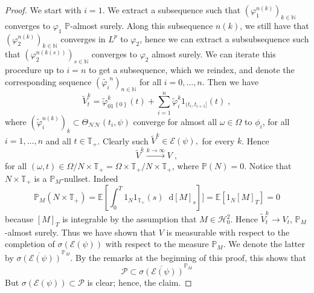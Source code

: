 \documentclass[11pt]{report}
\newcommand{\diff}{\mathop{}\!\mathrm{d}}
\theoremstyle{plain} %
\theoremstyle{definition} %
\theoremstyle{remark} %
\begin{document}
\begin{proof}
    We start with \(i=1\). We extract a subsequence such that \((\varphi_1^{n(k)})_{k\in\mathbb{N}}\) converges to \(\varphi_1\) \(\mathbb{P}\)-almost surely. Along this subsequence \(n(k)\), we still have that \((\varphi_{2}^{n(k)})_{k\in\mathbb{N}}\) converges in \(L^p\) to \(\varphi_2\), hence we can extract a subsubsequence such that \((\varphi_{2}^{n(k(s))})_{s\in\mathbb{N}}\) converges to \(\varphi_2\) almost surely. We can iterate this procedure up to \(i=n\) to get a subsequence, which we reindex, and denote the corresponding sequence \((\widetilde{\varphi_i}^n)_{n\in\mathbb{N}}\) for all \(i=0,\dots,n\). Then we have 
   \begin{equation}\label{eq:neural simple processes}
        \widetilde{V}_t^{k} = \widetilde{\varphi}^{k}_01_{\left\{ 0\right\}}(t)+\sum_{i=1}^n \widetilde{\varphi}_i^{k}1_{(t_i,t_{i+1}]}(t)\;,
    \end{equation}
    where \((\widetilde{\varphi}_i^{n(k)})_{k}\subset\Theta_{\mathcal{NN}}(t_i,\psi)\) converge for almost all \(\omega\in\Omega\) to \(\phi_i\), for all \(i=1,\dots,n\) and all \(t\in\mathbb{T}_+\). Clearly such \(\widetilde{V}^{k}\in\mathcal{E}(\psi),\) for every \(k\). Hence
    \begin{equation}
        \widetilde{V}^{k}\overset{k\to\infty}{\to}V\;,
    \end{equation}
    for all \((\omega,t)\in\Omega/N\times\mathbb{T}_+=\Omega\times\mathbb{T}_+/N\times \mathbb{T}_+\), where \(\mathbb{P}(N)=0\). Notice that  \(N\times\mathbb{T}_+\) is a \(\mathbb{P}_M\)-nullset. Indeed 
    \begin{equation}
        \mathbb{P}_M(N\times\mathbb{T}_+)=\mathbb{E}[\int_0^{T}1_N1_{\mathbb{T}_+}(s)\diff [M]_s]]=\mathbb{E}[1_N[M]_{T}]=0
    \end{equation}
    because \([M]_{T}\) is integrable by the assumption that \(M\in\mathcal{H}_{0}^2\). Hence \(\widetilde{V}_t^k\to V_t\), \(\mathbb{P}_M\)-almost surely. Thus we have shown that \(V\) is measurable with respect to the completion of \(\sigma(\mathcal{E}(\psi))\) with respect to the measure \(\mathbb{P}_M\). We denote the latter by \(\overline{\sigma(\mathcal{E}(\psi))}^{\mathbb{P}_M}\). By the remarks at the beginning of this proof, this shows that 
     \begin{equation}
        \mathcal{P}\subset\overline{\sigma(\mathcal{E}(\psi))}^{\mathbb{P}_M}
    \end{equation}
    But \(\sigma(\mathcal{E}(\psi))\subset\mathcal{P}\) is clear; hence, the claim. 
\end{proof}
\end{document}
